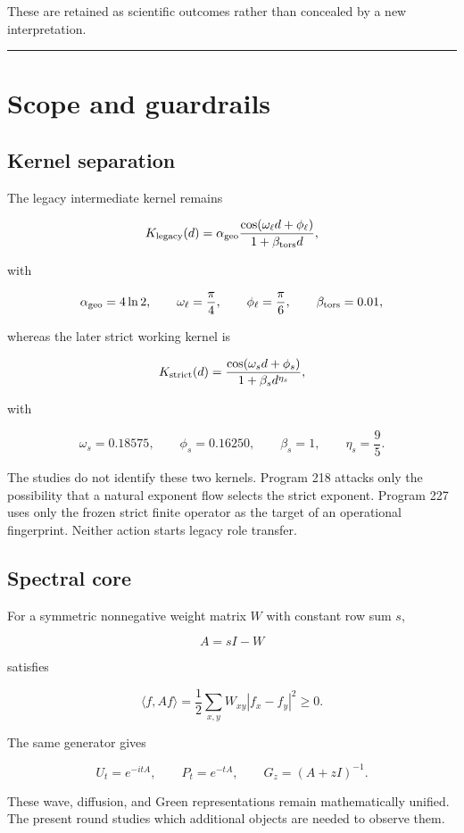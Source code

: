 \documentclass[11pt,a4paper,openany]{report}
\begin{document}
These are retained as scientific outcomes rather than concealed by a new interpretation.

\par\medskip\hrule\medskip

\chapter{Scope and guardrails}

\section{Kernel separation}

The legacy intermediate kernel remains

\[
K_{\rm legacy}(d)=
\alpha_{\rm geo}
\frac{\cos(\omega_\ell d+\phi_\ell)}
{1+\beta_{\rm tors}d},
\]

with

\[
\alpha_{\rm geo}=4\ln2,
\qquad
\omega_\ell=\frac\pi4,
\qquad
\phi_\ell=\frac\pi6,
\qquad
\beta_{\rm tors}=0.01,
\]

whereas the later strict working kernel is

\[
K_{\rm strict}(d)=
\frac{\cos(\omega_s d+\phi_s)}
{1+\beta_s d^{\eta_s}},
\]

with

\[
\omega_s=0.18575,
\qquad
\phi_s=0.16250,
\qquad
\beta_s=1,
\qquad
\eta_s=\frac95.
\]

The studies do not identify these two kernels. Program 218 attacks only the possibility that a natural exponent flow selects the strict exponent. Program 227 uses only the frozen strict finite operator as the target of an operational fingerprint. Neither action starts legacy role transfer.

\section{Spectral core}

For a symmetric nonnegative weight matrix \(W\) with constant row sum \(s\),

\[
A=sI-W
\]

satisfies

\[
\langle f,Af\rangle
=
\frac12\sum_{x,y}W_{xy}|f_x-f_y|^2\ge0.
\]

The same generator gives

\[
U_t=e^{-itA},
\qquad
P_t=e^{-tA},
\qquad
G_z=(A+zI)^{-1}.
\]

These wave, diffusion, and Green representations remain mathematically unified. The present round studies which additional objects are needed to observe them.
\end{document}
